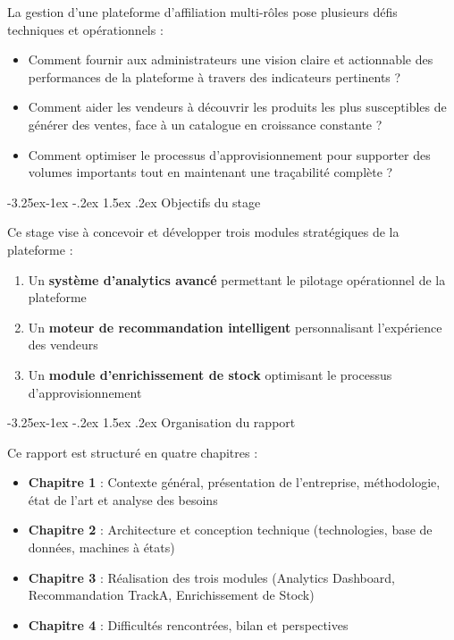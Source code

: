 \documentclass[12pt,a4paper,openany]{report}
\makeatletter
\renewcommand\subsection{\@startsection{subsection}{2}{\z@}%
  {-3.25ex\@plus -1ex \@minus -.2ex}%
  {1.5ex \@plus .2ex}%
  {\needspace{8\baselineskip}\normalfont\large\bfseries\color{primary!80!black}}}
\makeatother
\begin{document}
La gestion d'une plateforme d'affiliation multi-rôles pose plusieurs défis techniques et opérationnels :

\begin{itemize}
  \item Comment fournir aux administrateurs une vision claire et actionnable des performances de la plateforme à travers des indicateurs pertinents ?
  \item Comment aider les vendeurs à découvrir les produits les plus susceptibles de générer des ventes, face à un catalogue en croissance constante ?
  \item Comment optimiser le processus d'approvisionnement pour supporter des volumes importants tout en maintenant une traçabilité complète ?
\end{itemize}

\subsection{Objectifs du stage}

Ce stage vise à concevoir et développer trois modules stratégiques de la plateforme :

\begin{enumerate}
  \item Un \textbf{système d'analytics avancé} permettant le pilotage opérationnel de la plateforme
  \item Un \textbf{moteur de recommandation intelligent} personnalisant l'expérience des vendeurs
  \item Un \textbf{module d'enrichissement de stock} optimisant le processus d'approvisionnement
\end{enumerate}

\subsection{Organisation du rapport}

Ce rapport est structuré en quatre chapitres :

\begin{itemize}
  \item \textbf{Chapitre 1} : Contexte général, présentation de l'entreprise, méthodologie, état de l'art et analyse des besoins
  \item \textbf{Chapitre 2} : Architecture et conception technique (technologies, base de données, machines à états)
  \item \textbf{Chapitre 3} : Réalisation des trois modules (Analytics Dashboard, Recommandation TrackA, Enrichissement de Stock)
  \item \textbf{Chapitre 4} : Difficultés rencontrées, bilan et perspectives
\end{itemize}
\end{document}
